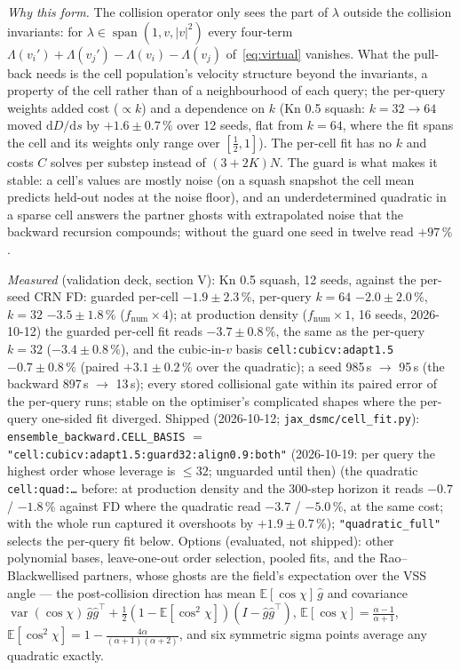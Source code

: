 \documentclass[11pt,a4paper]{article}
\numberwithin{equation}{section}
\newcommand{\E}{\mathbb{E}}
\newcommand{\code}[1]{\texttt{#1}}
\newcommand{\Lam}{\Lambda}
\newcommand{\dd}{\mathrm{d}}
\begin{document}
\emph{Why this form.}  The collision operator only sees the part of $\lambda$ outside the
collision invariants: for $\lambda \in \operatorname{span}(1, v, |v|^2)$ every four-term
$\Lam(v_i') + \Lam(v_j') - \Lam(v_i) - \Lam(v_j)$ of~\eqref{eq:virtual} vanishes.  What the pull-back
needs is the cell population's velocity structure beyond the invariants, a property of the
cell rather than of a neighbourhood of each query; the per-query weights added cost
($\propto k$) and a dependence on $k$ (Kn 0.5 squash: $k = 32 \to 64$ moved $\dd D/\dd s$ by
$+1.6\pm0.7\,\%$ over 12 seeds, flat from $k = 64$, where the fit spans the cell and its weights
only range over $[\tfrac12, 1]$).  The per-cell fit has no $k$ and costs $C$ solves per substep
instead of $(3+2K)N$.  The guard is what makes it stable: a cell's values are mostly noise (on a
squash snapshot the cell mean predicts held-out nodes at the noise floor), and an
underdetermined quadratic in a sparse cell answers the partner ghosts with extrapolated
noise that the backward recursion compounds; without the guard one seed in twelve read
$+97\,\%$.

\emph{Measured} (validation deck, section V): Kn 0.5 squash, 12 seeds, against the per-seed CRN FD:
guarded per-cell $-1.9\pm2.3\,\%$, per-query $k = 64$ $-2.0\pm2.0\,\%$, $k = 32$ $-3.5\pm1.8\,\%$
($f_{\mathrm{num}}\times4$); at production density ($f_{\mathrm{num}}\times1$, 16 seeds, 2026-10-12) the guarded
per-cell fit reads $-3.7\pm0.8\,\%$, the same as the per-query $k = 32$ ($-3.4\pm0.8\,\%$), and the
cubic-in-$v$ basis \code{cell:cubicv:adapt1.5} $-0.7\pm0.8\,\%$ (paired $+3.1\pm0.2\,\%$ over the quadratic); a seed
985\,s $\to$ 95\,s (the backward 897\,s $\to$ 13\,s); every stored collisional gate within its paired
error of the per-query runs; stable on the optimiser's complicated shapes where the per-query
one-sided fit diverged.  Shipped (2026-10-12; \code{jax\_dsmc/cell\_fit.py}):
\code{ensemble\_backward.CELL\_BASIS} $=$ \code{"cell:cubicv:adapt1.5:guard32:align0.9:both"} (2026-10-19: per query the highest order whose leverage is $\le 32$; unguarded until then)
(the quadratic \code{cell:quad:\dots} before: at
production density and the 300-step horizon it reads $-0.7$ / $-1.8\,\%$ against FD where the quadratic read
$-3.7$ / $-5.0\,\%$, at the same cost; with the whole run captured it overshoots by $+1.9\pm0.7\,\%$); \code{"quadratic\_full"}
selects the per-query fit below.  Options (evaluated, not shipped): other polynomial
bases, leave-one-out order selection, pooled fits, and the Rao--Blackwellised partners,
whose ghosts are the field's expectation over the VSS angle --- the post-collision direction
has mean $\E[\cos\chi]\,\hat g$ and covariance
$\operatorname{var}(\cos\chi)\,\hat g\hat g^\top + \tfrac12(1 - \E[\cos^2\chi])(I - \hat g\hat g^\top)$,
$\E[\cos\chi] = \frac{\alpha - 1}{\alpha + 1}$, $\E[\cos^2\chi] = 1 - \frac{4\alpha}{(\alpha+1)(\alpha+2)}$, and six
symmetric sigma points average any quadratic exactly.
\end{document}
